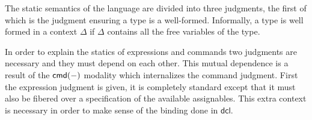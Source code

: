 The static semantics of the language are divided into three judgments,
the first of which is the judgment ensuring a type is a
well-formed. Informally, a type is well formed in a context $\Delta$
if $\Delta$ contains all the free variables of the type.
In order to explain the statics of expressions and commands two
judgments are necessary and they must depend on each other. This
mutual dependence is a result of the $\mathsf{cmd}(-)$ modality which
internalizes the command judgment. First the expression judgment is
given, it is completely standard except that it must also be fibered
over a specification of the available assignables. This extra context
is necessary in order to make sense of the binding done in
$\mathsf{dcl}$.
